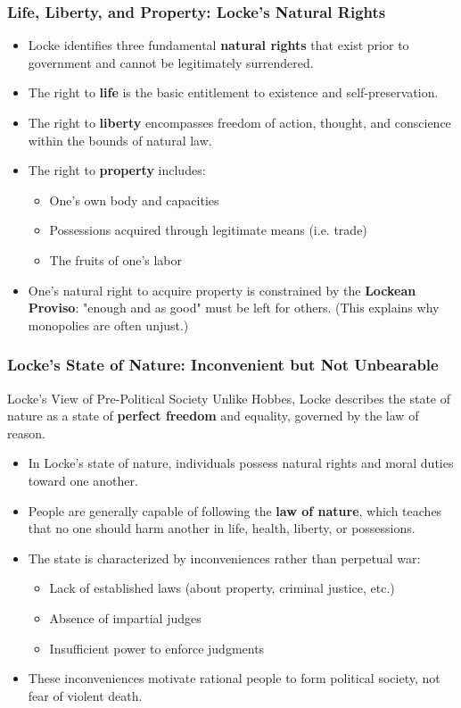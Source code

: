 \documentclass[aspectratio=169]{beamer}
\begin{document}
\begin{frame}
  \frametitle{Life, Liberty, and Property: Locke's Natural Rights}
  
  \begin{itemize}
    \item Locke identifies three fundamental \textbf{natural rights} that exist prior to government and cannot be legitimately surrendered.
    \item The right to \textbf{life} is the basic entitlement to existence and self-preservation.
    \item The right to \textbf{liberty} encompasses freedom of action, thought, and conscience within the bounds of natural law.
    \item The right to \textbf{property} includes:
      \begin{itemize}
        \item One's own body and capacities 
        \item Possessions acquired through legitimate means (i.e. trade)
        \item The fruits of one's labor
      \end{itemize}
    \item One's natural right to acquire property is constrained by the \textbf{Lockean Proviso}: "enough and as good" must be left for others. (This explains why monopolies are often unjust.)
  \end{itemize}
\end{frame}

\begin{frame}
  \frametitle{Locke's State of Nature: Inconvenient but Not Unbearable}
  
  \begin{block}{Locke's View of Pre-Political Society}
    Unlike Hobbes, Locke describes the state of nature as a state of \textbf{perfect freedom} and equality, governed by the law of reason.
  \end{block}
  
  \begin{itemize}
    \item In Locke's state of nature, individuals possess natural rights and moral duties toward one another.
    \item People are generally capable of following the \textbf{law of nature}, which teaches that no one should harm another in life, health, liberty, or possessions.
    \item The state is characterized by inconveniences rather than perpetual war:
      \begin{itemize}
        \item Lack of established laws (about property, criminal justice, etc.)
        \item Absence of impartial judges
        \item Insufficient power to enforce judgments
      \end{itemize}
    \item These inconveniences motivate rational people to form political society, not fear of violent death.
  \end{itemize}
\end{frame}
\end{document}
